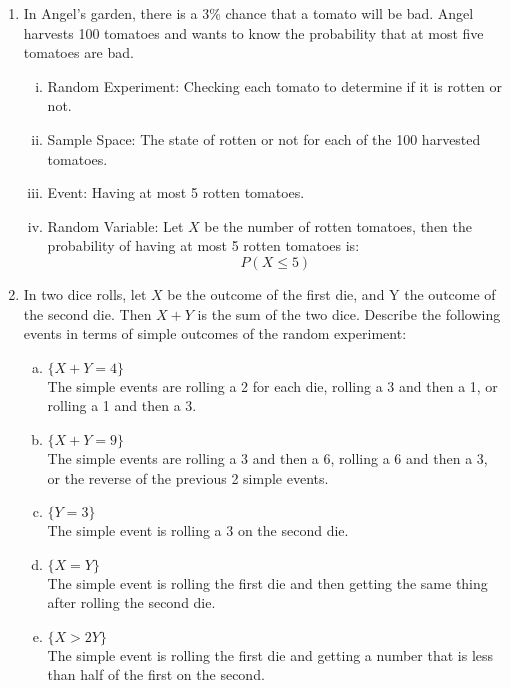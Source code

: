 \documentclass{article}
\begin{document}
\begin{large}
\begin{enumerate}[1.]
\begin{enumerate}[i.]
		\end{enumerate}		
		
		\item In Angel’s garden, there is a $3$\% chance that a tomato will be bad. Angel
harvests 100 tomatoes and wants to know the probability that at most five
tomatoes are bad.
		\begin{enumerate}[i.]
			\item Random Experiment: Checking each tomato to determine if it is rotten or not.
		
			\item Sample Space: The state of rotten or not for each of the 100 harvested tomatoes.
		
			\item Event: Having at most 5 rotten tomatoes. 
		
			\item Random Variable: Let $X$ be the number of rotten tomatoes, then the probability of having at most 5 rotten tomatoes is:
			$$P(X \leq 5)$$
		
		\end{enumerate}
		
		\item In two dice rolls, let $X$ be the outcome of the first die, and Y the outcome of
the second die. Then $X+Y$ is the sum of the two dice. Describe the following
events in terms of simple outcomes of the random experiment:
		\begin{enumerate}[(a)]
			\item $\{X + Y = 4\}$\\
			The simple events are rolling a 2 for each die, rolling a 3 and then a 1, or rolling a 1 and then a 3.
			
			\item $\{X + Y = 9\}$\\
			The simple events are rolling a 3 and then a 6, rolling a 6 and then a 3, or the reverse of the previous 2 simple events.
		
			\item $\{Y = 3\}$\\
			The simple event is rolling a 3 on the second die.
			\item $\{X = Y\}$\\
			The simple event is rolling the first die and then getting the same thing after rolling the second die.
			
			\item $\{X > 2Y\}$\\
			The simple event is rolling the first die and getting a number that is less than half of the first on the second.
		

\end{enumerate}
\end{enumerate}
\end{large}
\end{document}
